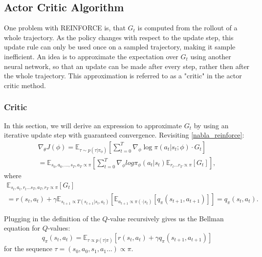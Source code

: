 \subsection{Actor Critic Algorithm}
\label{AC-Alg}
One problem with REINFORCE is, that $G_t$ is computed from the rollout of a whole trajectory. As the policy changes with respect to the update step, this update 
rule can only be used once on a sampled trajectory, making it sample inefficient. An idea is to approximate the expectation over $G_t$ using another neural network, so that an update can be made after every step, 
rather then after the whole trajectory. This approximation is referred to as a "critic" in the actor critic method.

\subsubsection{Critic}
In this section, we will derive an expression to approximate $G_t$ by using an iterative update step with guaranteed convergence.
Revisiting \ref{nabla_reinforce}: 
\begin{equation}
    \label{ac policy update}
    \begin{aligned}
        \nabla_{\theta} J(\phi) = \mathbb{E}_{\tau \sim p(\tau | \pi_{\phi})} \left[ \sum_{t=0}^T \nabla_{\phi} \log \pi(a_t|s_t;\phi) \cdot  G_t\right]\\
        = \mathbb{E}_{s_0, a_0, ... ,s_T, a_T \propto \pi} \left[
            \sum_{t=0}^{T}\nabla_{\phi} log \pi_{\phi}(a_t|s_t) \mathbb{E}_{r_t...r_T \propto \pi} \left[ G_t \right]
        \right],
    \end{aligned}
\end{equation}
where 
\begin{equation}
    \begin{align}
        \mathbb{E}_{s_t, a_t, r_t...s_T, a_T, r_T \propto \pi} \left[ G_t \right] \\
        = r(s_t,a_t) + \gamma \mathbb{E}_{s_{t+1} \propto T(s_{t+1}|s_t, a_t)}\left[\mathbb{E}_{a_{t+1} \propto \pi(\cdot|s_t)}  \left[q_{\pi}(s_{t+1},a_{t+1})\right]  \right]
        = q_{\pi}(s_{t},a_{t}).
    \end{align}
\end{equation}

Plugging in the definition of the $Q$-value recursively gives us the Bellman equation for $Q$-values:
\begin{equation}
q_{\pi}(s_t, a_t) = \mathbb{E}_{\tau \propto p(\tau|\pi)} \left[ r(s_t,a_t) + \gamma q_{\pi}(s_{t+1}, a_{t+1})\right]
\end{equation}
for the sequence $\tau = (s_0,a_0, s_1, a_1...) \propto \pi$.\\


